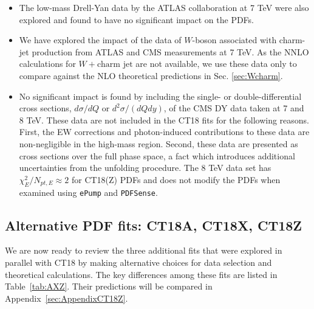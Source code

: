 \begin{itemize}
\item The low-mass Drell-Yan data by the ATLAS collaboration at 7 TeV \cite{Aad:2014qja} were also explored and found to have no significant impact on the PDFs. 

\item We have explored the impact of the data of $W$-boson associated with charm-jet production from ATLAS \cite{Aad:2014xca} and CMS \cite{Chatrchyan:2013uja} measurements at 7 TeV. As the NNLO calculations for $W+\mbox{charm jet}$ are not available, we use these data only to compare against the NLO theoretical predictions in Sec. \ref{sec:Wcharm}. 

\item No significant impact is found by including the single- or double-differential cross sections, $d\sigma/dQ$ or $d^2\sigma/(dQdy)$, of the CMS DY data taken at 7 \cite{Chatrchyan:2013tia} and 8 \cite{CMS:2014jea} TeV. These data are not included in the CT18 fits for the following reasons. First, the EW corrections and photon-induced contributions to these data are non-negligible in the high-mass region. Second, these data are presented as cross sections over the full phase space, a fact which introduces additional uncertainties from the unfolding procedure.
The 8 TeV data set has $\chi^2_E/N_{pt, E} \approx 2$ for CT18(Z) PDFs and does not modify the PDFs when examined using \texttt{ePump} and \texttt{PDFSense}.
\end{itemize} 




\subsection{Alternative PDF fits: CT18A, CT18X, CT18Z}
\label{sec:alt} 
We are now ready to review the three additional fits that were explored in parallel with CT18 by making alternative choices for data selection and theoretical calculations.
The key differences among these fits are listed in Table~\ref{tab:AXZ}. Their predictions will be compared in Appendix~\ref{sec:AppendixCT18Z}.


